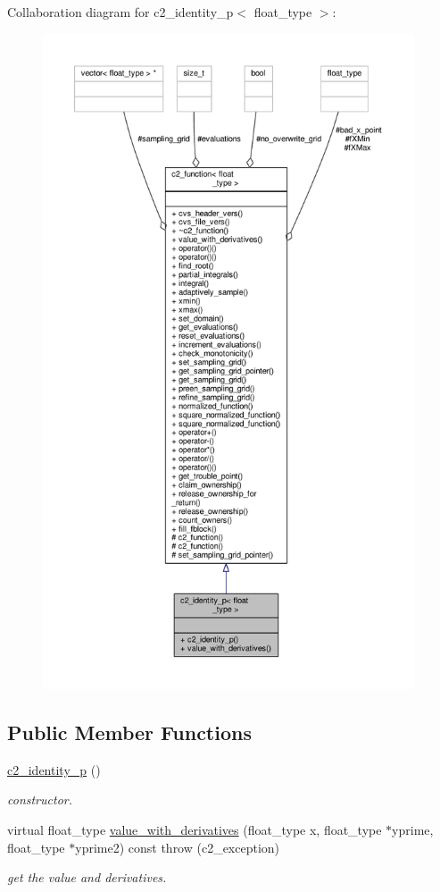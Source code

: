 Collaboration diagram for c2\+\_\+identity\+\_\+p$<$ float\+\_\+type $>$\+:
\nopagebreak
\begin{figure}[H]
\begin{center}
\leavevmode
\includegraphics[height=550pt]{classc2__identity__p__coll__graph}
\end{center}
\end{figure}
\subsection*{Public Member Functions}
\begin{DoxyCompactItemize}
\item 
\hyperlink{classc2__identity__p_a9b00bbd9a2dc1572cf75e38019cfed94}{c2\+\_\+identity\+\_\+p} ()
\begin{DoxyCompactList}\small\item\em constructor. \end{DoxyCompactList}\item 
virtual float\+\_\+type \hyperlink{classc2__identity__p_a69a30999382af761b9360179dbedbc88}{value\+\_\+with\+\_\+derivatives} (float\+\_\+type x, float\+\_\+type $\ast$yprime, float\+\_\+type $\ast$yprime2) const   throw (c2\+\_\+exception)
\begin{DoxyCompactList}\small\item\em get the value and derivatives. \end{DoxyCompactList}\end{DoxyCompactItemize}
